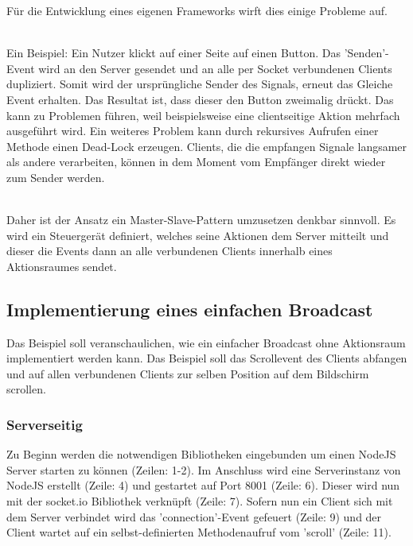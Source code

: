 Für die Entwicklung eines eigenen \Gls{Framework}s wirft dies einige Probleme auf.

\\ Ein  Beispiel: Ein Nutzer klickt auf einer Seite auf einen Button. Das 'Senden'-Event wird an den Server gesendet und an alle per Socket verbundenen Clients dupliziert. Somit wird der ursprüngliche Sender des Signals, erneut das Gleiche \Gls{Event} erhalten. Das Resultat ist, dass dieser den Button zweimalig drückt. Das kann zu Problemen führen, weil beispielsweise eine clientseitige Aktion mehrfach ausgeführt wird. Ein weiteres Problem kann durch rekursives Aufrufen einer Methode einen Dead-Lock erzeugen. Clients, die die empfangen Signale langsamer als andere verarbeiten, können in dem Moment vom Empfänger direkt wieder zum Sender werden.
	
	\\Daher ist der Ansatz ein Master-Slave-Pattern umzusetzen denkbar sinnvoll. Es wird ein Steuergerät definiert, welches seine Aktionen dem Server mitteilt und dieser die \Gls{Event}s dann an alle verbundenen Clients innerhalb eines Aktionsraumes sendet.
	
	
	\subsection{Implementierung eines einfachen Broadcast}
	Das Beispiel soll veranschaulichen, wie ein einfacher Broadcast ohne Aktionsraum implementiert werden kann. Das Beispiel soll das Scrollevent des Clients abfangen und auf allen verbundenen Clients zur selben Position auf dem Bildschirm scrollen.
	
	\subsubsection{Serverseitig}
	Zu Beginn werden die notwendigen Bibliotheken eingebunden um einen \Gls{NodeJS} Server starten zu können (Zeilen: 1-2). Im Anschluss wird  eine Serverinstanz von \Gls{NodeJS} erstellt (Zeile: 4) und gestartet auf Port 8001 (Zeile: 6). Dieser wird nun mit der socket.io Bibliothek verknüpft (Zeile: 7). Sofern nun ein Client sich mit dem Server verbindet wird das 'connection'-Event gefeuert (Zeile: 9) und der Client wartet auf ein selbst-definierten Methodenaufruf vom 'scroll' (Zeile: 11).
	
